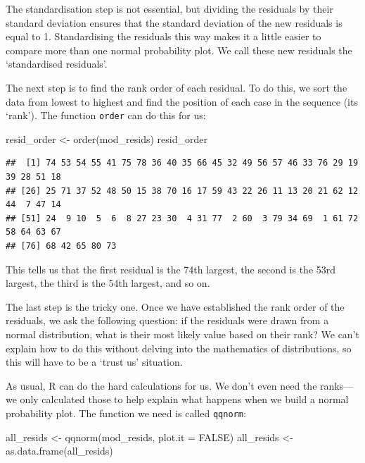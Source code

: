 \documentclass[
]{book}
\newenvironment{Shaded}{\begin{snugshade}}{\end{snugshade}}
\newcommand{\AttributeTok}[1]{\textcolor[rgb]{0.77,0.63,0.00}{#1}}
\newcommand{\ConstantTok}[1]{\textcolor[rgb]{0.00,0.00,0.00}{#1}}
\newcommand{\FunctionTok}[1]{\textcolor[rgb]{0.00,0.00,0.00}{#1}}
\newcommand{\NormalTok}[1]{#1}
\newcommand{\OtherTok}[1]{\textcolor[rgb]{0.56,0.35,0.01}{#1}}
\begin{document}
The standardisation step is not essential, but dividing the residuals by their standard deviation ensures that the standard deviation of the new residuals is equal to 1. Standardising the residuals this way makes it a little easier to compare more than one normal probability plot. We call these new residuals the `standardised residuals'.

The next step is to find the rank order of each residual. To do this, we sort the data from lowest to highest and find the position of each case in the sequence (its `rank'). The function \texttt{order} can do this for us:

\begin{Shaded}
\begin{Highlighting}[]
\NormalTok{resid\_order }\OtherTok{\textless{}{-}} \FunctionTok{order}\NormalTok{(mod\_resids)}
\NormalTok{resid\_order}
\end{Highlighting}
\end{Shaded}

\begin{verbatim}
##  [1] 74 53 54 55 41 75 78 36 40 35 66 45 32 49 56 57 46 33 76 29 19 39 28 51 18
## [26] 25 71 37 52 48 50 15 38 70 16 17 59 43 22 26 11 13 20 21 62 12 44  7 47 14
## [51] 24  9 10  5  6  8 27 23 30  4 31 77  2 60  3 79 34 69  1 61 72 58 64 63 67
## [76] 68 42 65 80 73
\end{verbatim}

This tells us that the first residual is the 74th largest, the second is the 53rd largest, the third is the 54th largest, and so on.

The last step is the tricky one. Once we have established the rank order of the residuals, we ask the following question: if the residuals were drawn from a normal distribution, what is their most likely value based on their rank? We can't explain how to do this without delving into the mathematics of distributions, so this will have to be a `trust us' situation.

As usual, R can do the hard calculations for us. We don't even need the ranks---we only calculated those to help explain what happens when we build a normal probability plot. The function we need is called \texttt{qqnorm}:

\begin{Shaded}
\begin{Highlighting}[]
\NormalTok{all\_resids }\OtherTok{\textless{}{-}} \FunctionTok{qqnorm}\NormalTok{(mod\_resids, }\AttributeTok{plot.it =} \ConstantTok{FALSE}\NormalTok{)}
\NormalTok{all\_resids }\OtherTok{\textless{}{-}} \FunctionTok{as.data.frame}\NormalTok{(all\_resids)}
\end{Highlighting}
\end{Shaded}
\end{document}
